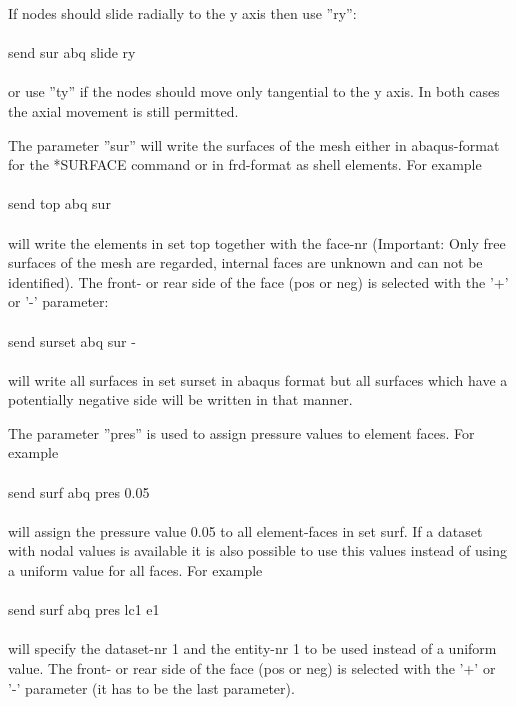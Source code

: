\documentclass{article}
\begin{document}
If nodes should slide radially to the y axis then use ''ry'':\\\\send sur abq slide ry\\\\ or use ''ty'' if the nodes should move only tangential to the y axis. In both cases the axial movement is still permitted.

The parameter ''sur'' will write the surfaces of the mesh either in abaqus-format for the *SURFACE command or in frd-format as shell elements. For example\\\\send top abq sur\\\\will write the elements in set top together with the face-nr (Important: Only free surfaces of the mesh are regarded, internal faces are unknown and can not be identified). The front- or rear side of the face (pos or neg) is selected with the '+' or '-' parameter:\\\\send surset abq sur -\\\\will write all surfaces in set surset in abaqus format but all surfaces which have a potentially negative side will be written in that manner. 

The parameter ''pres'' is used to assign pressure values to element faces. For example\\\\send surf abq pres 0.05\\\\will assign the pressure value 0.05 to all element-faces in set surf. If a dataset with nodal values is available it is also possible to use this values instead of using a uniform value for all faces. For example\\\\send surf abq pres lc1 e1\\\\will specify the dataset-nr 1 and the entity-nr 1 to be used instead of a uniform value. The front- or rear side of the face (pos or neg) is selected with the '+' or '-' parameter (it has to be the last parameter).
\end{document}
